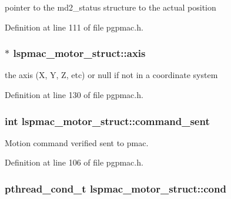 pointer to the md2\-\_\-status structure to the actual position 



Definition at line 111 of file pgpmac.\-h.

\hypertarget{structlspmac__motor__struct_a7437ef16c2dce65bde4dda1ea00e9df3}{
\subsubsection[{axis}]{$\ast$ lspmac\-\_\-motor\-\_\-struct\-::axis}}\label{structlspmac__motor__struct_a7437ef16c2dce65bde4dda1ea00e9df3}


the axis (X, Y, Z, etc) or null if not in a coordinate system 



Definition at line 130 of file pgpmac.\-h.

\hypertarget{structlspmac__motor__struct_a59a7f007476b2428fd3c5bd7f24440e8}{
\subsubsection[{command\-\_\-sent}]{\setlength{\rightskip}{0pt plus 5cm}int lspmac\-\_\-motor\-\_\-struct\-::command\-\_\-sent}}\label{structlspmac__motor__struct_a59a7f007476b2428fd3c5bd7f24440e8}


Motion command verified sent to pmac. 



Definition at line 106 of file pgpmac.\-h.

\hypertarget{structlspmac__motor__struct_aa0ea4108b8fed5b41ff91ca7266f3d84}{
\subsubsection[{cond}]{\setlength{\rightskip}{0pt plus 5cm}pthread\-\_\-cond\-\_\-t lspmac\-\_\-motor\-\_\-struct\-::cond}}\label{structlspmac__motor__struct_aa0ea4108b8fed5b41ff91ca7266f3d84}


